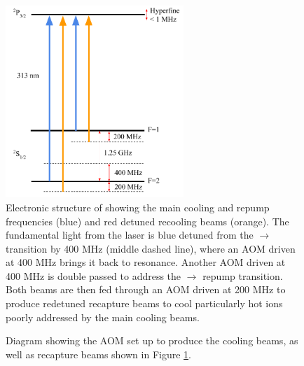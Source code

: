 \begin{figure}[H]
	\centering
	\includegraphics[width=0.6\textwidth]{images/Be_cooling_lasers.pdf}
	\caption{Electronic structure of  showing the main cooling and repump frequencies (blue) and red detuned recooling beams (orange). The fundamental light from the laser is blue detuned from the $\rightarrow$ transition by 400 MHz (middle dashed line), where an AOM driven at 400 MHz brings it back to resonance. Another AOM driven at 400 MHz is double passed to address the $\rightarrow$ repump transition. Both beams are then fed through an AOM driven at 200 MHz to produce redetuned recapture beams to cool particularly hot  ions poorly addressed by the main cooling beams.}
	\label{fig: Be structure}
\end{figure}

\begin{figure}[H]
	\centering
	\caption{Diagram showing the AOM set up to produce the cooling beams, as well as recapture beams shown in Figure \ref{fig: Be structure}.}
	\label{fig: AOMs}
\end{figure}

